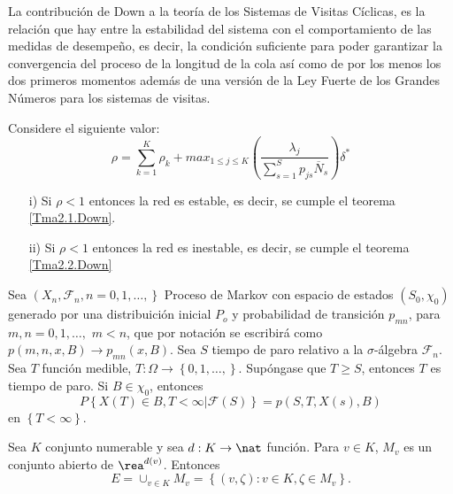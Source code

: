 La contribuci\'on de Down a la teor\'ia de los Sistemas de Visitas
C\'iclicas, es la relaci\'on que hay entre la estabilidad del
sistema con el comportamiento de las medidas de desempe\~no, es
decir, la condici\'on suficiente para poder garantizar la
convergencia del proceso de la longitud de la cola as\'i como de
por los menos los dos primeros momentos adem\'as de una versi\'on
de la Ley Fuerte de los Grandes N\'umeros para los sistemas de
visitas.


\begin{Teo}\label{Tma2.3.Down}
Considere el siguiente valor:
\begin{equation}\label{Eq.Rho.1serv}
\rho=\sum_{k=1}^{K}\rho_{k}+max_{1\leq j\leq K}\left(\frac{\lambda_{j}}{\sum_{s=1}^{S}p_{js}\overline{N}_{s}}\right)\delta^{*}
\end{equation}
\begin{itemize}
\item[i)] Si $\rho<1$ entonces la red es estable, es decir, se cumple el teorema \ref{Tma2.1.Down}.

\item[ii)] Si $\rho<1$ entonces la red es inestable, es decir, se cumple el teorema \ref{Tma2.2.Down}
\end{itemize}
\end{Teo}

\begin{Teo}
Sea $\left(X_{n},\mathcal{F}_{n},n=0,1,\ldots,\right\}$ Proceso de
Markov con espacio de estados $\left(S_{0},\chi_{0}\right)$
generado por una distribuici\'on inicial $P_{o}$ y probabilidad de
transici\'on $p_{mn}$, para $m,n=0,1,\ldots,$ $m<n$, que por
notaci\'on se escribir\'a como $p\left(m,n,x,B\right)\rightarrow
p_{mn}\left(x,B\right)$. Sea $S$ tiempo de paro relativo a la
$\sigma$-\'algebra $\mathcal{F}_{n}$. Sea $T$ funci\'on medible,
$T:\Omega\rightarrow\left\{0,1,\ldots,\right\}$. Sup\'ongase que
$T\geq S$, entonces $T$ es tiempo de paro. Si $B\in\chi_{0}$,
entonces
\begin{equation}\label{Prop.Fuerte.Markov}
P\left\{X\left(T\right)\in
B,T<\infty|\mathcal{F}\left(S\right)\right\} =
p\left(S,T,X\left(s\right),B\right)
\end{equation}
en $\left\{T<\infty\right\}$.
\end{Teo}


Sea $K$ conjunto numerable y sea $d:K\rightarrow\nat$ funci\'on.
Para $v\in K$, $M_{v}$ es un conjunto abierto de
$\rea^{d\left(v\right)}$. Entonces \[E=\cup_{v\in
K}M_{v}=\left\{\left(v,\zeta\right):v\in K,\zeta\in
M_{v}\right\}.\]

